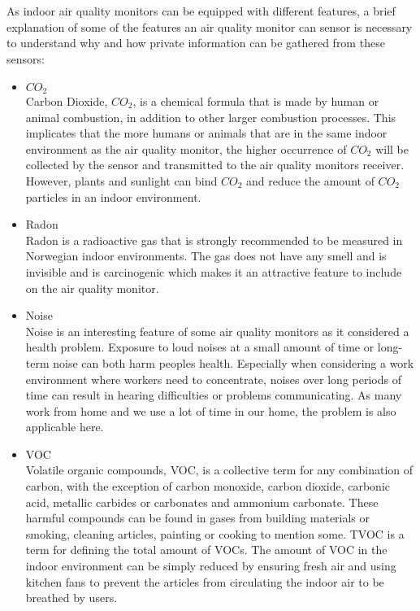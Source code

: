 \\\\
As indoor air quality monitors can be equipped with different features, a brief explanation of some of the features an air quality monitor can sensor is necessary to understand why and how private information can be gathered from these sensors:
\begin{itemize}
    \item \(CO_2\)\\
        Carbon Dioxide, \(CO_2\), is a chemical formula that is made by human or animal combustion, in addition to other larger combustion processes. \cite{CO2} This implicates that the more humans or animals that are in the same indoor environment as the air quality monitor, the higher occurrence of \(CO_2\) will be collected by the sensor and transmitted to the air quality monitors receiver. However, plants and sunlight can bind \(CO_2\) and reduce the amount of \(CO_2\) particles in an indoor environment. 
    \item Radon\\
        Radon is a radioactive gas that is strongly recommended to be measured in Norwegian indoor environments. \cite{Radon} The gas does not have any smell and is invisible and is carcinogenic which makes it an attractive feature to include on the air quality monitor. 
    \item Noise\\
        Noise is an interesting feature of some air quality monitors as it considered a health problem. \cite{Noise} Exposure to loud noises at a small amount of time or long-term noise can both harm peoples health. Especially when considering a work environment where workers need to concentrate, noises over long periods of time can result in hearing difficulties or problems communicating. As many work from home and we use a lot of time in our home, the problem is also applicable here. 
    \item VOC\\
        Volatile organic compounds, VOC, is a collective term for any combination of carbon, with the exception of carbon monoxide, carbon dioxide, carbonic acid, metallic carbides or carbonates and ammonium carbonate. \cite{VOC} These harmful compounds can be found in gases from building materials or smoking, cleaning articles, painting or cooking to mention some. TVOC is a term for defining the total amount of VOCs. The amount of VOC in the indoor environment can be simply reduced by ensuring fresh air and using kitchen fans to prevent the articles from circulating the indoor air to be breathed by users. \cite{RecommendedIAQ}

\end{itemize}
